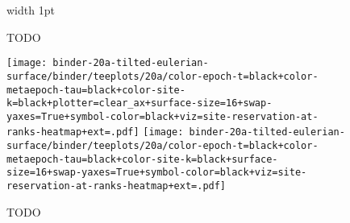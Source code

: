 \begin{figure*}
\begin{subfigure}{\linewidth}
\begin{minipage}[]{1\linewidth}
\noindent{}%
\hspace{-1ex}%
{\vrule width 1pt}%
\noindent{}%
\end{minipage}\vspace{-1ex}

\caption{TODO}
\label{fig:hanoi-intuition:TODO}
\end{subfigure}


\begin{subfigure}{\linewidth}
\texttt{[image: binder-20a-tilted-eulerian-surface/binder/teeplots/20a/color-epoch-t=black+color-metaepoch-tau=black+color-site-k=black+plotter=clear\_ax+surface-size=16+swap-yaxes=True+symbol-color=black+viz=site-reservation-at-ranks-heatmap+ext=.pdf]}%
\texttt{[image: binder-20a-tilted-eulerian-surface/binder/teeplots/20a/color-epoch-t=black+color-metaepoch-tau=black+color-site-k=black+surface-size=16+swap-yaxes=True+symbol-color=black+viz=site-reservation-at-ranks-heatmap+ext=.pdf]}
\caption{TODO}
\label{fig:hanoi-intuition:TODO}


\end{subfigure}
\end{figure*}
